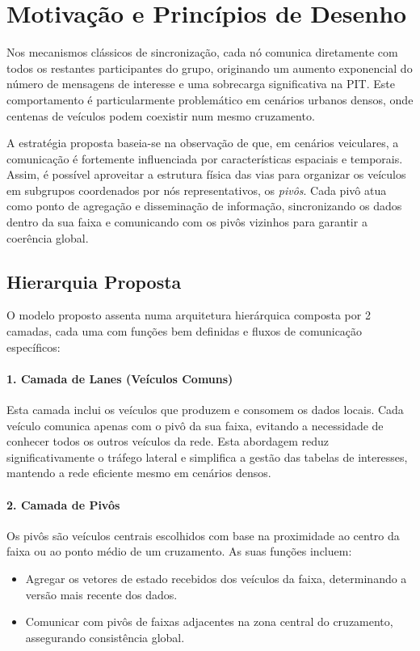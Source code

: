 \section{Motivação e Princípios de Desenho}

Nos mecanismos clássicos de sincronização, cada nó comunica diretamente com todos os restantes participantes do grupo, originando um aumento exponencial do número de mensagens de interesse e uma sobrecarga significativa na \gls{PIT}. Este comportamento é particularmente problemático em cenários urbanos densos, onde centenas de veículos podem coexistir num mesmo cruzamento.

A estratégia proposta baseia-se na observação de que, em cenários veiculares, a comunicação é fortemente influenciada por características espaciais e temporais. Assim, é possível aproveitar a estrutura física das vias para organizar os veículos em subgrupos coordenados por nós representativos, os \textit{pivôs}. Cada pivô atua como ponto de agregação e disseminação de informação, sincronizando os dados dentro da sua faixa e comunicando com os pivôs vizinhos para garantir a coerência global.

\subsection{Hierarquia Proposta}

O modelo proposto assenta numa arquitetura hierárquica composta por 2 camadas, cada uma com funções bem definidas e fluxos de comunicação específicos:

\paragraph{1. Camada de Lanes (Veículos Comuns)}
Esta camada inclui os veículos que produzem e consomem os dados locais. Cada veículo comunica apenas com o pivô da sua faixa, evitando a necessidade de conhecer todos os outros veículos da rede. Esta abordagem reduz significativamente o tráfego lateral e simplifica a gestão das tabelas de interesses, mantendo a rede eficiente mesmo em cenários densos.
\paragraph{2. Camada de Pivôs}
Os pivôs são veículos centrais escolhidos com base na proximidade ao centro da faixa ou ao ponto médio de um cruzamento. As suas funções incluem:
\begin{itemize}
\item Agregar os vetores de estado recebidos dos veículos da faixa, determinando a versão mais recente dos dados.
\item Comunicar com pivôs de faixas adjacentes na zona central do cruzamento, assegurando consistência global.
\end{itemize}


